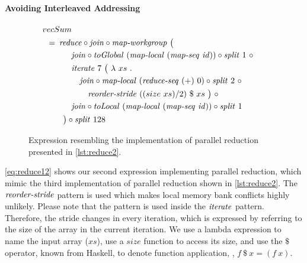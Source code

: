 \paragraph{Avoiding Interleaved Addressing}
\begin{figure}
  \begin{align*}
    &\hspace{-1.5em}vecSum\\
    &\hspace{-2em}\quad\begin{aligned}
      &=\hspace{.2em}
        \reduce \circ \join \circ \mapWorkgroup\ \big(\\
        &\qquad\quad \join \circ \toGlobal\ (\mapLocal\ (\mapSeq\ \id)) \circ \splitN\ 1\ \circ\\
        &\qquad\quad \iterateN\ 7\ \big(\ \lambda\ xs\ .\\
        &\qquad\qquad \join \circ \mapLocal\ (\reduceSeq\ (+)\ 0) \circ \splitN\ 2\ \circ\\
        &\qquad\qquad\quad \reorderStride\ ((size\ xs)/2)\ \$\ xs\ \big)\ \circ\\
        &\qquad\quad \join \circ \toLocal\ (\mapLocal\ (\mapSeq\ \id)) \circ \splitN\ 1\\
        &\qquad\big) \circ \splitN\ 128
    \end{aligned}
  \end{align*}
  \caption{Expression resembling the implementation of parallel reduction presented in \autoref{lst:reduce2}.}
  \label{eq:reduce12}
\end{figure}
%
\autoref{eq:reduce12} shows our second expression implementing parallel reduction, which mimic the third implementation of parallel reduction shown in \autoref{lst:reduce2}.
The $\text{\textit{reorder-stride}}$ pattern is used which makes local memory bank conflicts highly unlikely.
Please note that the pattern is used inside the $\text{\textit{iterate}}$ pattern.
Therefore, the stride changes in every iteration, which is expressed by referring to the size of the array in the current iteration.
We use a lambda expression to name the input array ($xs$), use a $size$ function to access its size, and use the $\$$ operator, known from Haskell, to denote function application, \ie, $f\ \$\ x = (f\ x)$.


